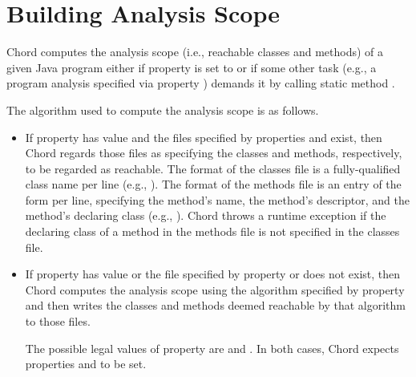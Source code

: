 \section{Building Analysis Scope}
\label{sec:building-scope}

Chord computes the analysis scope (i.e., reachable classes and methods) of a given Java program
either if property  is set to  or if some other task (e.g.,
a program analysis specified via property ) demands it by
calling static method .

The algorithm used to compute the analysis scope is as follows.

\begin{itemize}
\item
If property  has value  and the files specified by properties
 and  exist,
then Chord regards those files as specifying the classes and methods, respectively,
to be regarded as reachable.  The format
of the classes file is a fully-qualified class name per line (e.g., ).  The format
of the methods file is an entry of the form  per line,
specifying the method's name, the method's descriptor, and the method's declaring class
(e.g., \code{main:([Ljava/lang/String;)V@foo.bar.Main+}).
Chord throws a runtime exception if the declaring class of a method in the methods file is not
specified in the classes file.

\item
If property  has value  or the file specified by
property  or  does not exist,
then Chord computes the analysis scope
using the algorithm specified by property  and then
writes the classes and methods deemed reachable by that algorithm to those files.

The possible legal values of property  are  and .
In both cases, Chord expects properties  and 
to be set.


\end{itemize}
